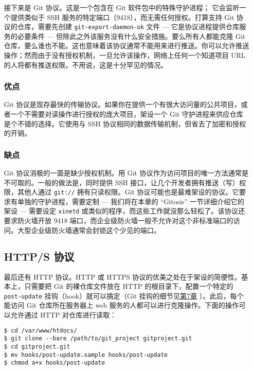 \documentclass[a4paper]{book}
\newcommand{\prechap}{第}
\newcommand{\postchap}{章}
\newcommand{\chapref}[1]{\hyperref[chap:#1]{\prechap #1\postchap}}
\begin{document}
接下来是 Git 协议。这是一个包含在 Git 软件包中的特殊守护进程； 它会监听一个提供类似于 SSH 服务的特定端口（9418），而无需任何授权。打算支持 Git 协议的仓库，需要先创建 \texttt{git-export-daemon-ok} 文件 --- 它是协议进程提供仓库服务的必要条件 --- 但除此之外该服务没有什么安全措施。要么所有人都能克隆 Git 仓库，要么谁也不能。这也意味着该协议通常不能用来进行推送。你可以允许推送操作；然而由于没有授权机制，一旦允许该操作，网络上任何一个知道项目 URL 的人将都有推送权限。不用说，这是十分罕见的情况。

\subsubsection{优点}

Git 协议是现存最快的传输协议。如果你在提供一个有很大访问量的公共项目，或者一个不需要对读操作进行授权的庞大项目，架设一个 Git 守护进程来供应仓库是个不错的选择。它使用与 SSH 协议相同的数据传输机制，但省去了加密和授权的开销。

\subsubsection{缺点}

Git 协议消极的一面是缺少授权机制。用 Git 协议作为访问项目的唯一方法通常是不可取的。一般的做法是，同时提供 SSH 接口，让几个开发者拥有推送（写）权限，其他人通过 \texttt{git://} 拥有只读权限。Git 协议可能也是最难架设的协议。它要求有单独的守护进程，需要定制 --- 我们将在本章的 “Gitosis” 一节详细介绍它的架设 --- 需要设定 \texttt{xinetd} 或类似的程序，而这些工作就没那么轻松了。该协议还要求防火墙开放 9418 端口，而企业级防火墙一般不允许对这个非标准端口的访问。大型企业级防火墙通常会封锁这个少见的端口。

\subsection{HTTP/S 协议}

最后还有 HTTP 协议。HTTP 或 HTTPS 协议的优美之处在于架设的简便性。基本上，只需要把 Git 的裸仓库文件放在 HTTP 的根目录下，配置一个特定的 \texttt{post-update} 挂钩（hook）就可以搞定（Git 挂钩的细节见\chapref{7} ）。此后，每个能访问 Git 仓库所在服务器上 web 服务的人都可以进行克隆操作。下面的操作可以允许通过 HTTP 对仓库进行读取：

\begin{shaded}\begin{verbatim}
$ cd /var/www/htdocs/
$ git clone --bare /path/to/git_project gitproject.git
$ cd gitproject.git
$ mv hooks/post-update.sample hooks/post-update
$ chmod a+x hooks/post-update
\end{verbatim}\end{shaded}
\end{document}

